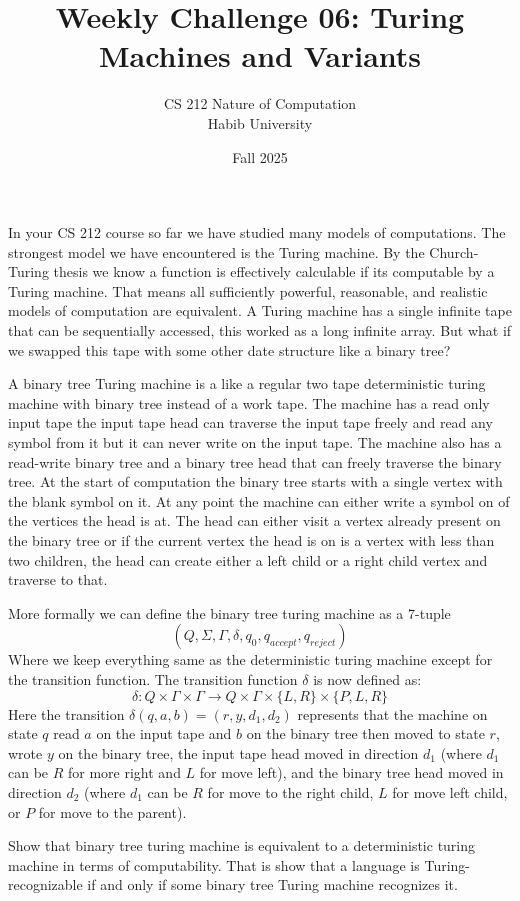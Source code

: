 \documentclass[a4paper]{exam}
\title{Weekly Challenge 06: Turing Machines and Variants}
\author{CS 212 Nature of Computation\\Habib University}
\date{Fall 2025}
\begin{document}
\maketitle

\begin{questions}
    In your CS 212 course so far we have studied many models of computations. The strongest model we have encountered is the Turing machine. By the Church-Turing thesis we know a function is effectively calculable if its computable by a Turing machine. That means all sufficiently powerful, reasonable, and realistic models of computation are equivalent. A Turing machine has a single infinite tape that can be sequentially accessed, this worked as a long infinite array. But what if we swapped this tape with some other date structure like a binary tree? 

    A binary tree Turing machine is a like a regular two tape deterministic turing machine with binary tree instead of a work tape. The machine has a read only input tape the input tape head can traverse the input tape freely and read any symbol from it but it can never write on the input tape. The machine also has a read-write binary tree and a binary tree head that can freely traverse the binary tree. At the start of computation the binary tree starts with a single vertex with the blank symbol on it. At any point the machine can either write a symbol on of the vertices the head is at. The head can either visit a vertex already present on the binary tree or if the current vertex the head is on is a vertex with less than two children, the head can create either a left child or a right child vertex and traverse to that.  

    More formally we can define the binary tree turing machine as a 7-tuple 
    $$(Q, \Sigma, \Gamma, \delta, q_0, q_{accept}, q_{reject})$$ 
    Where we keep everything same as the deterministic turing machine except for the transition function. The transition function $\delta$ is now defined as: 
    $$\delta: Q \times \Gamma \times \Gamma \to Q \times \Gamma \times\{L,R\} \times \{P, L, R\}$$
    Here the transition $\delta(q,a,b) = (r,y,d_1,d_2)$ represents that the machine on state $q$ read $a$ on the input tape and $b$ on the binary tree then moved to state $r$, wrote $y$ on the binary tree, the input tape head moved in direction $d_1$ (where $d_1$ can be $R$ for more right and $L$ for move left), and the binary tree head moved in direction $d_2$ (where $d_1$ can be $R$ for move to the right child, $L$ for move left child, or $P$ for move to the parent).

   Show that binary tree turing machine is equivalent to a deterministic turing machine in terms of computability. That is show that a language is Turing-recognizable if and only if some binary tree Turing machine recognizes it.
 
    \begin{solution}
    \end{solution}
    
    

    
  
\end{questions}
\end{document}

